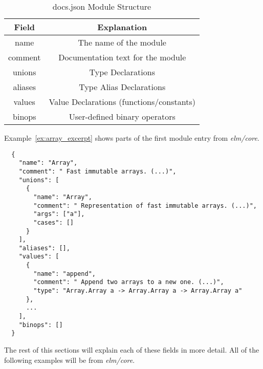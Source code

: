 \documentclass[../thesis.tex]{subfiles}
\begin{document}
\begin{table}[htpb]
    \centering
    \caption{docs.json Module Structure}
    \label{tab:documentation_fields}
    \begin{tabular}{|c|c|}
        \hline
        Field & Explanation \\
        \hline
        name & The name of the module \\
        comment & Documentation text for the module \\
        unions & Type Declarations \\
        aliases & Type Alias Declarations \\
        values & Value Declarations (functions/constants) \\
        binops & User-defined binary operators \\
        \hline
    \end{tabular}
\end{table}

Example~\ref{ex:array_excerpt} shows parts of the first module entry from \textit{elm/core}.
\begin{example}\label{ex:array_excerpt}
\begin{verbatim}
  {
    "name": "Array",
    "comment": " Fast immutable arrays. (...)",
    "unions": [
      {
        "name": "Array",
        "comment": " Representation of fast immutable arrays. (...)",
        "args": ["a"],
        "cases": []
      }
    ],
    "aliases": [],
    "values": [
      {
        "name": "append",
        "comment": " Append two arrays to a new one. (...)",
        "type": "Array.Array a -> Array.Array a -> Array.Array a"
      },
      ...
    ],
    "binops": []
  }
\end{verbatim}
\end{example}
The rest of this sections will explain each of these fields in more detail.
All of the following examples will be from \textit{elm/core}.
\end{document}
